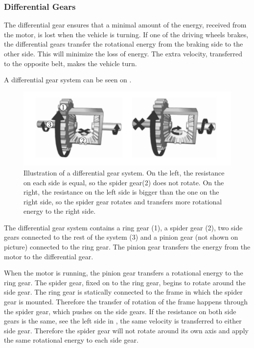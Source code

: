 \subsubsection{Differential Gears} \label{sec:Differentialgears}
The differential gear ensures that a minimal amount of the energy, received from the motor, is lost when the vehicle is turning. If one of the driving wheels brakes, the differential gears transfer the rotational energy from the braking side to the other side. This will minimize the loss of energy. The extra velocity, transferred to the opposite belt, makes the vehicle turn.

A differential gear system can be seen on .

\begin{figure}[H]
	\centering
	\includegraphics[scale=0.7]{figures/diffGearLightGray.pdf}
	\caption{Illustration of a differential gear system. On the left, the resistance on each side is equal, so the spider gear(2) does not rotate. On the right, the resistance on the left side is bigger than the one on the right side, so the spider gear rotates and transfers more rotational energy to the right side. \cite{MechanicalEngineering}}
	\label{diffGearLight}
\end{figure}

The differential gear system contains a ring gear (1), a spider gear (2), two side gears connected to the rest of the system (3) and a pinion gear (not shown on picture) connected to the ring gear. The pinion gear transfers the energy from the motor to the differential gear.

When the motor is running, the pinion gear transfers a rotational energy to the ring gear. The spider gear, fixed on to the ring gear, begins to rotate around the side gear. The ring gear is statically connected to the frame in which the spider gear is mounted. Therefore the transfer of rotation of the frame happens through the spider gear, which pushes on the side gears. If the resistance on both side gears is the same, see the left side in , the same velocity is transferred to either side gear. Therefore the spider gear will not rotate around its own axis and apply the same rotational energy to each side gear.

